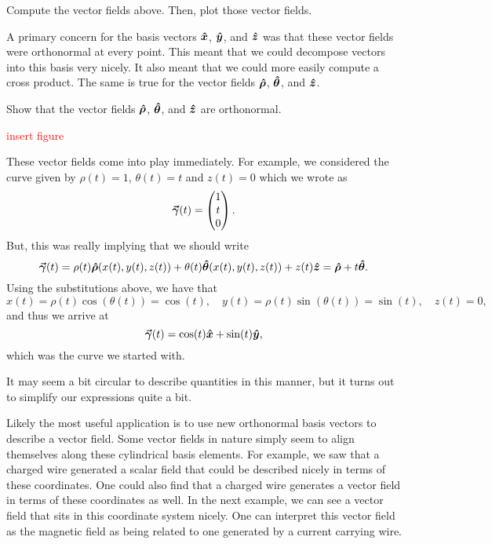 \begin{exercise}
    Compute the vector fields above. Then, plot those vector fields.
\end{exercise}

A primary concern for the basis vectors $\boldsymbol{\hat{x}}$, $\boldsymbol{\hat{y}}$, and $\boldsymbol{\hat{z}}$ was that these vector fields were orthonormal at every point. This meant that we could decompose vectors into this basis very nicely.  It also meant that we could more easily compute a cross product.  The same is true for the vector fields $\boldsymbol{\hat{\rho}}$, $\boldsymbol{\hat{\theta}}$, and $\boldsymbol{\hat{z}}$.  

\begin{exercise}
    Show that the vector fields $\boldsymbol{\hat{\rho}}$, $\boldsymbol{\hat{\theta}}$, and $\boldsymbol{\hat{z}}$ are orthonormal.
\end{exercise}

\textcolor{red}{insert figure}

These vector fields come into play immediately. For example, we considered the curve given by $\rho(t)=1$, $\theta(t)=t$ and $z(t)=0$ which we wrote as
\[
\boldsymbol{\vec{\gamma}}(t) = \begin{pmatrix} 1 \\ t \\ 0 \end{pmatrix}.
\]
But, this was really implying that we should write
\[
\boldsymbol{\vec{\gamma}}(t) = \rho(t)\boldsymbol{\hat{\rho}}(x(t),y(t),z(t)) + \theta(t)\boldsymbol{\hat{\theta}}(x(t),y(t),z(t))+z(t)\boldsymbol{\hat{z}} = \boldsymbol{\hat{\rho}} + t\boldsymbol{\hat{\theta}}.
\]
Using the substitutions above, we have that
\[
x(t) = \rho(t)\cos(\theta(t)) = \cos(t), \quad y(t) = \rho(t)\sin(\theta(t))=\sin(t), \quad z(t)=0,
\]
and thus we arrive at
\[
\boldsymbol{\vec{\gamma}}(t) = \cos(t)\boldsymbol{\hat{x}} + \sin(t)\boldsymbol{\hat{y}},
\]
which was the curve we started with.

\begin{remark}
It may seem a bit circular to describe quantities in this manner, but it turns out to simplify our expressions quite a bit.
\end{remark}

Likely the most useful application is to use new orthonormal basis vectors to describe a vector field.  Some vector fields in nature simply seem to align themselves along these cylindrical basis elements.  For example, we saw that a charged wire generated a scalar field that could be described nicely in terms of these coordinates.  One could also find that a charged wire generates a vector field in terms of these coordinates as well. In the next example, we can see a vector field that sits in this coordinate system nicely.  One can interpret this vector field as the magnetic field as being related to one generated by a current carrying wire.


